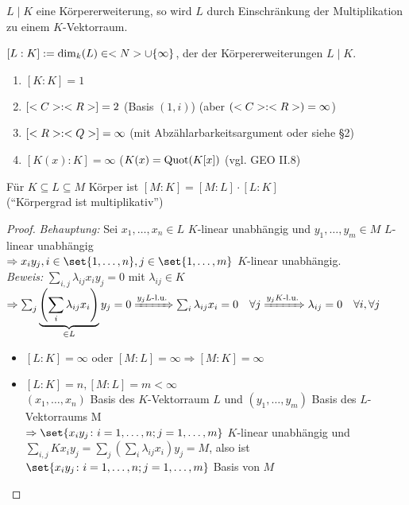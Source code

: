\begin{remark}
	$L\mid K$ eine Körpererweiterung, so wird $L$ durch Einschränkung der Multiplikation zu einem $K$-Vektorraum.
\end{remark}

\begin{definition}[Körpergrad]
	$[L:K]:= \dim_k(L) \in <N> \cup \{\infty\}$, der  der Körpererweiterungen $L\mid K$.
\end{definition}

\begin{example}
	\begin{enumerate}[label=(\alph*)]
		\item $[K: K] = 1$
		\item $[<C>:<R>] = 2$ (Basis $(1,i)$) (aber $(<C>:<R>) = \infty$)
		\item $[<R>:<Q>] = \infty$ (mit Abzählarbarkeitsargument oder siehe §2) %
		\item $[K(x):K] = \infty$ ($K(x) = \operatorname{Quot}(K[x])$ (vgl. GEO II.8)
	\end{enumerate}
\end{example}

\begin{proposition}
	Für $K \subseteq L \subseteq M$ Körper ist $[M:K] = [M:L]\cdot [L:K]$ \\
	(``Körpergrad ist multiplikativ'')
\end{proposition}

\begin{proof} %
	\emph{Behauptung:} Sei $x_1, \dots, x_n \in L$ $K$-linear unabhängig und $y_1, \dots, y_m \in M$ $L$-linear unabhängig\\
	$\Rightarrow x_i y_j, i \in \set{1,\dots,n}, j \in \set{1, \dots, m}$ $K$-linear unabhängig.\\
	\emph{Beweis:} $\sum_{i,j} \lambda_{ij}x_i y_j = 0$ mit $\lambda_{ij} \in K$\\
	$\Rightarrow \sum_{j}\underbrace{\left( \sum_{i} \lambda_{ij}x_i \right)}_{\in L}y_j = 0 
	\xRightarrow{y_j L\text{-l.u.}} \sum_{i} \lambda_{ij} x_i = 0\quad\forall j
	\xRightarrow{y_j K\text{-l.u.}} \lambda_{ij} = 0\quad\forall i, \forall j$
	\begin{itemize}
		\item $[L:K] = \infty$ oder $[M:L] = \infty \Rightarrow [M:K] = \infty$
		\item $[L:K] = n, [M:L] = m < \infty$\\
		$(x_1, \dots, x_n)$ Basis des $K$-Vektorraum $L$ und $(y_1, \dots, y_m)$ Basis des $L$-Vektorraums M\\
		$\Rightarrow \set{x_i y_j \colon i = 1, \dots, n; j = 1, \dots, m}$ $K$-linear unabhängig und \\
		$\sum_{i,j} Kx_i y_j = \sum_{j}\left( \sum_{i} \lambda_{ij}x_i \right)y_j = M$, also ist \\
		$\set{x_i y_j \colon i = 1, \dots ,n; j = 1, \dots, m}$ Basis von $M$ 
	\end{itemize}
\end{proof}

